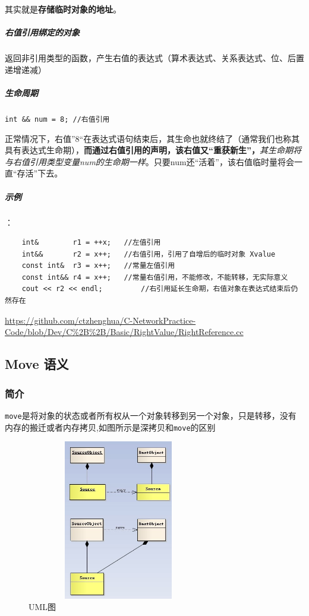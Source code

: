 \documentclass[UTF8,a4paper,12pt]{ctexbook} %
\begin{document}
				其实就是\textbf{存储临时对象的地址}。
			
			\subparagraph{右值引用绑定的对象}  返回非引用类型的函数，产生右值的表达式（算术表达式、关系表达式、位、后置递增递减）
			
			\subparagraph{生命周期}\verb|int && num = 8; //右值引用| 
			
			正常情况下，右值”8“在表达式语句结束后，其生命也就终结了（通常我们也称其具有表达式生命期），\textbf{而通过右值引用的声明，该右值又“重获新生”，}\textit{其生命期将与右值引用类型变量num的生命期一样}。只要num还“活着”，该右值临时量将会一直“存活”下去。
			
			\subparagraph{示例}：
			\begin{lstlisting}
	int&		r1 = ++x;	//左值引用
	int&&		r2 = x++;	//右值引用，引用了自增后的临时对象 Xvalue
	const int&	r3 = x++;	//常量左值引用
	const int&&	r4 = x++;	//常量右值引用，不能修改，不能转移，无实际意义
	cout << r2 << endl;			//右引用延长生命期，右值对象在表达式结束后仍然存在
			\end{lstlisting}	
			\url{https://github.com/ctzhenghua/C-NetworkPractice-Code/blob/Dev/C%2B%2B/Basic/RightValue/RightReference.cc}
			
		
		\subsection{Move 语义}
			\subsubsection{简介}	
				\verb|move|是将对象的状态或者所有权从一个对象转移到另一个对象，只是转移，没有内存的搬迁或者内存拷贝,如图所示是深拷贝和\verb|move|的区别
				
				\begin{figure}[H]
					\centering
					\includegraphics[angle=0,width=8cm,height=7cm]{moveANDcopy.jpg}%
					\caption{UML图}
					\label{fig:winClass}
				\end{figure}
				
\end{document}
